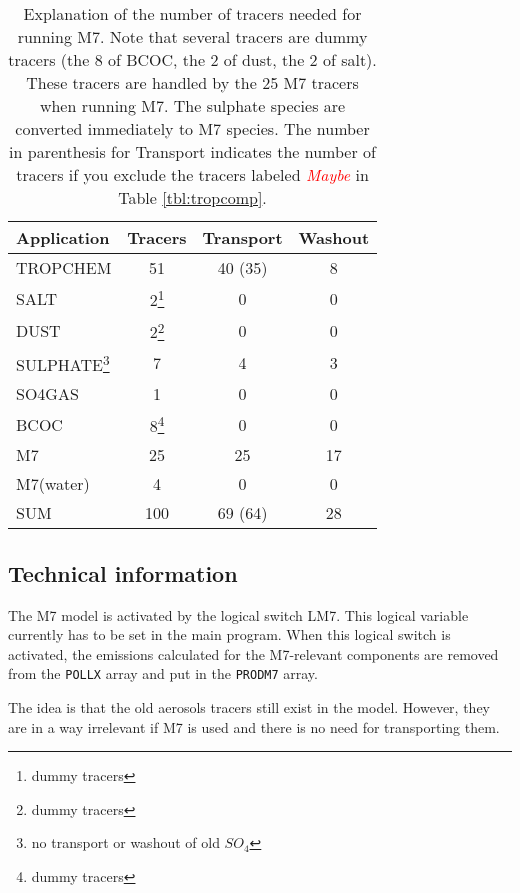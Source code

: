 \begin{table}
\caption{Explanation of the number of tracers needed for running
  M7. Note that several tracers are dummy tracers (the 8 of BCOC, the
  2 of dust, the 2 of salt). These tracers are handled by the 25 M7
  tracers when running M7. The sulphate species are converted
  immediately to M7 species. The number in parenthesis for
  Transport indicates the  number of tracers if you exclude the
  tracers labeled \textcolor{red}{\it Maybe} in Table
  \ref{tbl:tropcomp}.}
 \label{tbl:tracerm7}
\begin{minipage}{\linewidth}
\begin{tabular}{|l|c|c|c|}
\hline
Application      & Tracers  & Transport  & Washout \\
\hline
TROPCHEM         &  51      &  40 (35)   &  8 \\
\hline
SALT             &  2\footnote{dummy tracers} &  0   &  0 \\
\hline
DUST             &  2\footnote{dummy tracers} &  0   &  0 \\
\hline
SULPHATE\footnote{no transport or washout of old $SO_4$} 
                 & 7        &  4          &  3 \\  
\hline
SO4GAS           &  1       &  0          &  0 \\
\hline
BCOC             &  8\footnote{dummy tracers}  &  0   &  0 \\
\hline
M7               &  25      &  25         &  17 \\
\hline
M7(water)        &  4       &  0          &  0 \\
\hline
\hline
SUM              & 100      &  69 (64)    &  28 \\
\hline
\end{tabular}
\end{minipage}
\end{table}


\subsection{Technical information}

The M7 model is activated by the logical switch LM7. This logical
variable currently has to be set in the main program. When this
logical switch is activated, the emissions calculated for the
M7-relevant components are removed from the \verb#POLLX# array and put
in the \verb#PRODM7# array. 

The idea is that the old aerosols tracers still exist in the
model. However, they are in a way irrelevant if M7 is used and there
is no need for transporting them.


